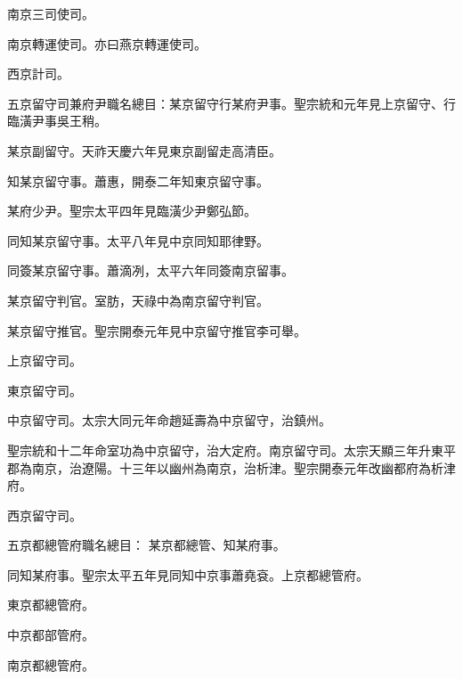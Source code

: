 \begin{pinyinscope}
 南京三司使司。



 南京轉運使司。亦曰燕京轉運使司。



 西京計司。



 五京留守司兼府尹職名總目：某京留守行某府尹事。聖宗統和元年見上京留守、行臨潢尹事吳王稍。



 某京副留守。天祚天慶六年見東京副留走高清臣。



 知某京留守事。蕭惠，開泰二年知東京留守事。



 某府少尹。聖宗太平四年見臨潢少尹鄭弘節。



 同知某京留守事。太平八年見中京同知耶律野。



 同簽某京留守事。蕭滴冽，太平六年同簽南京留事。



 某京留守判官。室肪，天祿中為南京留守判官。



 某京留守推官。聖宗開泰元年見中京留守推官李可舉。



 上京留守司。



 東京留守司。



 中京留守司。太宗大同元年命趙延壽為中京留守，治鎮州。



 聖宗統和十二年命室功為中京留守，治大定府。南京留守司。太宗天顯三年升東平郡為南京，治遼陽。十三年以幽州為南京，治析津。聖宗開泰元年改幽都府為析津府。



 西京留守司。



 五京都總管府職名總目：
 某京都總管、知某府事。



 同知某府事。聖宗太平五年見同知中京事蕭堯袞。上京都總管府。



 東京都總管府。



 中京都部管府。



 南京都總管府。




\end{pinyinscope}

